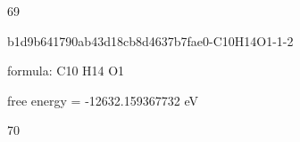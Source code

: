 \documentclass{article}
\begin{document}
69

\vspace{1cm}


b1d9b641790ab43d18cb8d4637b7fae0-C10H14O1-1-2



formula: C10 H14 O1



free energy = -12632.159367732 eV

70
\end{document}
